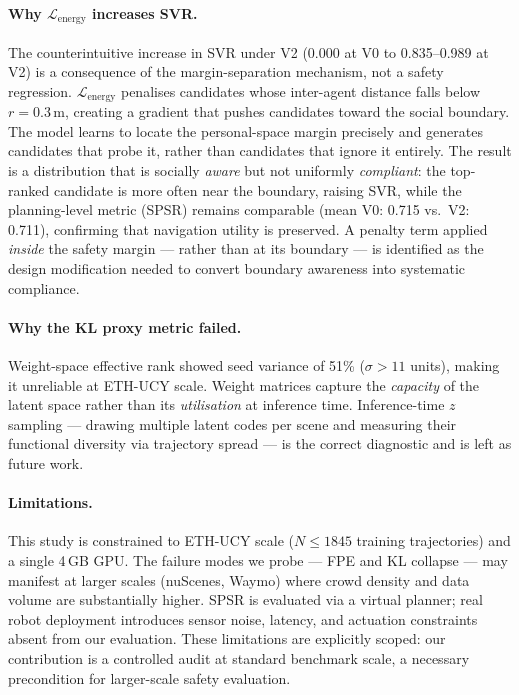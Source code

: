 \documentclass{article}
\begin{document}
\paragraph{Why \(\mathcal{L}_{\text{energy}}\) increases SVR.}
The counterintuitive increase in SVR under V2 (0.000 at V0 to 0.835--0.989
at V2) is a consequence of the margin-separation mechanism, not a safety
regression. \(\mathcal{L}_{\text{energy}}\) penalises candidates whose
inter-agent distance falls below \(r = 0.3\)\,m, creating a gradient that
pushes candidates toward the social boundary. The model learns to locate the
personal-space margin precisely and generates candidates that probe it, rather
than candidates that ignore it entirely. The result is a distribution that is
socially \emph{aware} but not uniformly \emph{compliant}: the top-ranked
candidate is more often near the boundary, raising SVR, while the
planning-level metric (SPSR) remains comparable (mean V0: 0.715 vs.\ V2:
0.711), confirming that navigation utility is preserved. A penalty term applied
\emph{inside} the safety margin --- rather than at its boundary --- is
identified as the design modification needed to convert boundary awareness into
systematic compliance.
 
\paragraph{Why the KL proxy metric failed.}
Weight-space effective rank showed seed variance of 51\%
(\(\sigma > 11\) units), making it unreliable at ETH-UCY scale. Weight matrices
capture the \emph{capacity} of the latent space rather than its
\emph{utilisation} at inference time. Inference-time \(z\) sampling ---
drawing multiple latent codes per scene and measuring their functional diversity
via trajectory spread --- is the correct diagnostic and is left as future work.
 
\paragraph{Limitations.}
This study is constrained to ETH-UCY scale (\(N \leq 1845\) training
trajectories) and a single 4\,GB GPU. The failure modes we probe --- FPE and
KL collapse --- may manifest at larger scales (nuScenes, Waymo) where crowd
density and data volume are substantially higher. SPSR is evaluated via a
virtual planner; real robot deployment introduces sensor noise, latency, and
actuation constraints absent from our evaluation. These limitations are
explicitly scoped: our contribution is a controlled audit at standard benchmark
scale, a necessary precondition for larger-scale safety evaluation.
 
\end{document}
